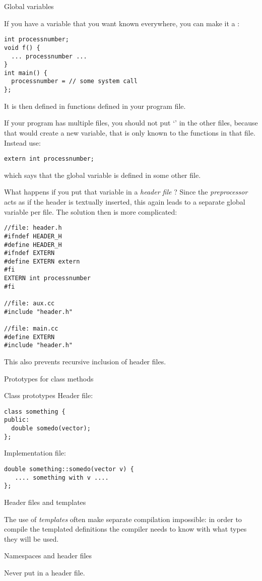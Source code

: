  {Global variables}
\label{ex:globalvar}

If you have a variable that you want known everywhere, you can make it
a :
\begin{verbatim}
int processnumber;
void f() {
  ... processnumber ...
}
int main() {
  processnumber = // some system call
};
\end{verbatim}
It is then defined in functions defined in your program file.

If your program has multiple files, you should not put `'
in the other files, because that would create a new variable, that is
only known to the functions in that file. Instead use:
\begin{verbatim}
extern int processnumber;
\end{verbatim}
which says that the global variable  is defined in
some other file.

What happens if you put that variable in a
%
\emph{header file}%
%
? Since the
%
\emph{preprocessor}%
acts as if the header is textually inserted, this again leads to
a separate global variable per file. The solution then is more
complicated:
\begin{verbatim}
//file: header.h
#ifndef HEADER_H
#define HEADER_H
#ifndef EXTERN
#define EXTERN extern
#fi
EXTERN int processnumber
#fi

//file: aux.cc
#include "header.h"

//file: main.cc
#define EXTERN
#include "header.h"
\end{verbatim}

This also prevents recursive inclusion of header files.

 {Prototypes for class methods}

\begin{block}{Class prototypes}
  \label{sl:class-proto}
  Header file:
\begin{verbatim}
class something {
public:
  double somedo(vector);
};
\end{verbatim}

Implementation file:
\begin{verbatim}
double something::somedo(vector v) {
   .... something with v ....
};
\end{verbatim}
\end{block}

 {Header files and templates}

The use of \emph{templates}
often make separate compilation impossible: in order to compile the
templated definitions the compiler needs to know with what types they
will be used.

 {Namespaces and header files}

Never put  in a header file.
